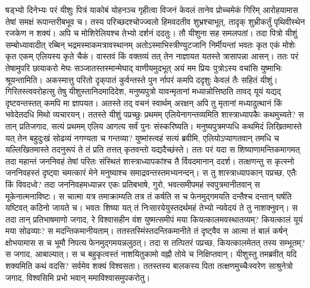 \adhyAya
{}
\vakya षड्भ्यो दिनेभ्यः परं यीशुः पित्रं याकोबं योहनञ्च गृहीत्वा विजनं केवलं तानेव प्रोच्चमेकं गिरिम् आरोहयामास तेषां समक्षं रूपान्तरीबभूव च।
\vakya तस्य परिच्छदश्चोज्ज्वलो हिमवदतीव शुभ्रश्चाभूत्, तादृक् शुभ्रीकर्तुं पृथिवीस्थेन रजकेण न शक्यं।
\vakya अपि च मोशिरेलियश्च तेभ्यो दर्शनं ददतुः।
\vakya तौ यीशुना सह समलपतां।
\vakya तदा पित्रो यीशुं सम्बोध्यावादीत् रब्बिन् भद्रमस्माकमत्रावस्थानम् अतोऽस्माभिस्त्रीण्युटजानि निर्मीयन्तां भवतः कृत एकं मोशेः कृत एकम् एलियस्य कृते चैकं।
\vakya वास्तवं किं वक्तव्यं तत् तेन नाज्ञायत यतस्ते त्रासापन्ना आसन्।
\vakya ततः परं तेषामुपरि छायाकरो मेघः सञ्जातस्तस्मान्मेघाद् वाणीयमुदभूत् अयं मम प्रियः पुत्रोऽस्य वचांसि युष्माभिः श्रूयन्तामिति।
\vakya अकस्मात्तु परितो दृक्‌पातं कुर्वन्तस्ते पुन र्नापरं कमपि ददृशुः केवलं तैः सहितं यीशुं।
\vakya गिरितस्त्ववरोहत्सु तेषु यीशुस्तानिदमादिदेश, मनुष्यपुत्रो यावन्मृतानां मध्यान्नोत्तिष्ठति तावद् यूयं यद्यद् दृष्टवन्तस्तत् कमपि मा ज्ञापयत।
\vakya अतस्ते तद् वचनं स्वार्थम् अरक्षन् अपि तु मृतानां मध्यादुत्थानं किं भवेदेतदधि मिथो व्यचारयन्।
\vakya ततस्ते यीशुं पप्रच्छुः प्रथमम् एलियेनागन्तव्यमिति शास्त्राध्यापकैः कथमुच्यते?
\vakya स तान् प्रतिजगाद, सत्यं प्रथमम् एलिय आगत्य सर्वं पुनः संस्करिष्यति। मनुष्यपुत्रमप्यधि कथमिदं लिखितमास्ते यत् तेन बहुदुःखं सोढव्यं नगण्यता च गन्तव्या?
\vakya युष्मांस्त्वहं सत्यं ब्रवीमि, एलियोऽप्यागतवान् तमधि च यल्लिखितमास्ते तदनुरूपं ते तं प्रति तत्तत् कृतवन्तो यद्यदैच्छंस्ते।
\vakya ततः परं यदा स शिष्याणामन्तिकमागमत् तदा महान्तं जननिवहं तेषां परितः संस्थितं शास्त्राध्यापकांश्च तै र्विवदमानान् ददर्श।
\vakya तत्क्षणन्तु स कृत्स्नो जननिवहस्तं दृष्ट्वा चमत्कारं मेने मनुष्याश्च समाद्रवन्तस्तमभ्यनन्दन्।
\vakya स तु शास्त्राध्यापकान् पप्रच्छ, एतैः किं विवदध्वे?
\vakya तदा जननिवहमध्यान्नर एकः प्रतिबभाषे, गुरो, भवत्समीपमहं स्वपुत्रमानीतवान् स मूकेनात्मनाविष्टः।
\vakya स चात्मा यत्र तमाक्राम्यति तत्र तं कर्षति स च फेनमुद्गमयति दन्तैश्च दन्तान् घर्षति यष्टिवत् कठिनो जायते च। भवतः शिष्या यत् तं निःसारयेयुस्तदर्थमहं तेभ्यो न्यवेदयं ते तु नाशक्नुवन्।
\vakya स तदा तान् प्रतिभाषमाणो जगाद, रे विश्वासहीन वंश युष्मत्समीपं मया कियत्कालमवस्थातव्यम्? कियत्कालं यूयं मया सोढव्याः? स मदन्तिकमानीयताम्।
\vakya ततस्तस्मिंस्तदन्तिकमानीते तं दृष्ट्वैव स आत्मा तं बालं कर्षन् क्षोभयामास स च भूमौ निपत्य फेनमुद्गमयन्नलुठत्।
\vakya तदा स तत्पितरं पप्रच्छ, कियत्कालमेतत् तस्य सम्भूतम्? स जगाद, आबाल्यात्।
\vakya स च बहुकृत्वस्तं नाशयितुकामो वह्नौ तोये च निक्षिप्तवान्।
\vakya यीशुस्तु तमब्रवीत् यदि शक्यमिति कथं वदसि? सर्वमेव शक्यं विश्वसता।
\vakya ततस्तस्य बालकस्य पिता तत्क्षणमुच्चैःस्वरेण साश्रुनेत्रो जगाद, विश्वसिमि प्रभो भवान् ममाविश्वासमुपकरोतु।
